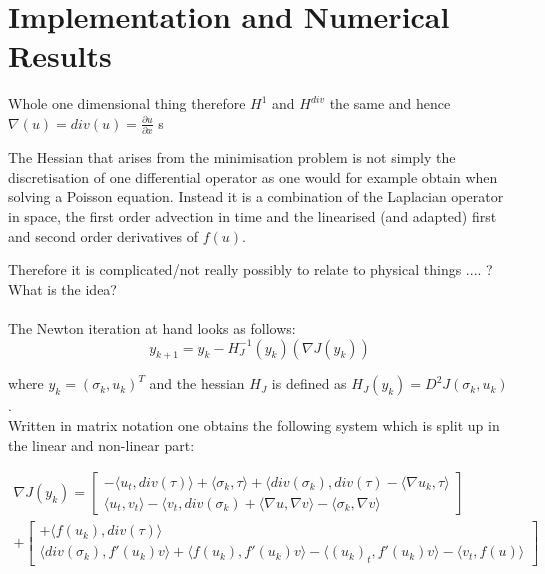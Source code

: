 \documentclass[../draft_1.tex]{subfiles}
\begin{document}
\chapter{Implementation and Numerical Results}


Whole one dimensional thing therefore $H^1$ and $H^{div}$ the same and hence $\nabla(u) = div(u) = \frac{\partial u}{\partial x}$
s 

The Hessian that arises from the minimisation problem is not simply the discretisation of one differential operator as one would for example obtain when solving a Poisson equation. Instead it is a combination of the Laplacian operator in space, the first order advection in time and the linearised (and adapted) first and second order derivatives of $f(u)$.

Therefore it is complicated/not really possibly to relate to physical things .... ? 
\\
What is the idea? \\
\\ 

The Newton iteration at hand looks as follows:
\begin{equation}
y_{k+1} = y_k - H_J^{-1}(y_k) (\nabla J(y_k))
\end{equation}

where $y_k = (\sigma_k, u_k)^T$ and the hessian $H_J$ is defined as $H_J(y_k) = D^2J(\sigma_k, u_k)$. 
\\
Written in matrix notation one obtains the following system which is split up in the linear and non-linear part:


\begin{equation}
\begin{aligned}
\nabla J(y_k) = 
\begin{bmatrix}
- \langle u_t, div(\tau) \rangle + \langle \sigma_k, \tau \rangle + \langle div(\sigma_k), div(\tau)  - \langle \nabla u_k, \tau \rangle  \\
\langle u_t, v_t \rangle - \langle v_t, div(\sigma_k)+ \langle \nabla u, \nabla v \rangle - \langle \sigma_k, \nabla v \rangle
\end{bmatrix} \\
+ \begin{bmatrix}
+ \langle f(u_k), div(\tau) \rangle \\
\langle div(\sigma_k), f'(u_k) v \rangle + \langle f(u_k), f'(u_k)v \rangle - \langle (u_k)_t, f'(u_k) v \rangle - \langle v_t, f(u) \rangle 
\end{bmatrix}
\end{aligned}
\end{equation}
\end{document}
